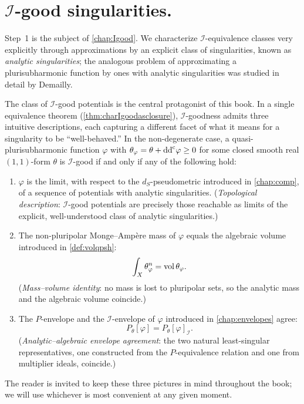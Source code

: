 \section*{$\mathcal{I}$-good singularities.}
Step~1 is the subject of \cref{chap:Igood}. We characterize $\mathcal{I}$-equivalence classes very explicitly through approximations by an explicit class of singularities, known as \emph{analytic singularities}; the analogous problem of approximating a plurisubharmonic function by ones with analytic singularities was studied in detail by Demailly.

The class of $\mathcal{I}$-good potentials is the central protagonist of this book. In a single equivalence theorem (\cref{thm:charIgoodasclosure}), $\mathcal{I}$-goodness admits three intuitive descriptions, each capturing a different facet of what it means for a singularity to be ``well-behaved.'' In the non-degenerate case, a quasi-plurisubharmonic function $\varphi$ with $\theta_{\varphi}=\theta+\mathrm{dd}^{\mathrm{c}}\varphi\geq 0$ for some closed smooth real $(1,1)$-form $\theta$ is $\mathcal{I}$-good if and only if any of the following hold:
\begin{enumerate}
    \item\label{itm:preface:L45:1} $\varphi$ is the limit, with respect to the $d_S$-pseudometric introduced in \cref{chap:comp}, of a sequence of potentials with analytic singularities. (\emph{Topological description}: $\mathcal{I}$-good potentials are precisely those reachable as limits of the explicit, well-understood class of analytic singularities.)
    \item\label{itm:preface:L45:2} The non-pluripolar Monge--Amp\`ere mass of $\varphi$ equals the algebraic volume introduced in \cref{def:volqpsh}:
    \[
        \int_X \theta_\varphi^n = \operatorname{vol}\theta_\varphi.
    \]
    (\emph{Mass--volume identity}: no mass is lost to pluripolar sets, so the analytic mass and the algebraic volume coincide.)
    \item\label{itm:preface:L45:3} The $P$-envelope and the $\mathcal{I}$-envelope of $\varphi$ introduced in \cref{chap:envelopes} agree:
    \[
        P_\theta[\varphi] = P_\theta[\varphi]_{\mathcal{I}}.
    \]
    (\emph{Analytic--algebraic envelope agreement}: the two natural least-singular representatives, one constructed from the $P$-equivalence relation and one from multiplier ideals, coincide.)
\end{enumerate}
The reader is invited to keep these three pictures in mind throughout the book; we will use whichever is most convenient at any given moment.

